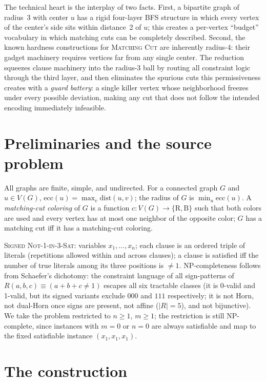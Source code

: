 \documentclass[11pt]{article}
\begin{document}
The technical heart is the interplay of two facts. First, a bipartite
graph of radius~3 with center $u$ has a rigid four-layer BFS structure
in which every vertex of the center's side sits within distance~2 of
$u$; this creates a per-vertex ``budget'' vocabulary in which matching
cuts can be completely described. Second, the known hardness
constructions for \textsc{Matching Cut} are inherently radius-4:
their gadget machinery requires vertices far from any single center.
The reduction squeezes clause machinery into the radius-3 ball by
routing all constraint logic through the third layer, and then
eliminates the spurious cuts this permissiveness creates with a
\emph{guard battery}: a single killer vertex whose neighborhood
freezes under every possible deviation, making any cut that does not
follow the intended encoding immediately infeasible.

\section{Preliminaries and the source problem}\label{sec:source}

All graphs are finite, simple, and undirected. For a connected graph
$G$ and $u \in V(G)$, $\mathrm{ecc}(u) = \max_v \mathrm{dist}(u,v)$;
the radius of $G$ is $\min_u \mathrm{ecc}(u)$. A \emph{matching-cut
coloring} of $G$ is a function $c : V(G) \to \{\mathrm{R},
\mathrm{B}\}$ such that both colors are used and every vertex has at
most one neighbor of the opposite color; $G$ has a matching cut iff
it has a matching-cut coloring.

\textsc{Signed Not-1-in-3-Sat}: variables $x_1,\dots,x_n$; each
clause is an ordered triple of literals (repetitions allowed within
and across clauses); a clause is satisfied iff the number of true
literals among its three positions is $\neq 1$. NP-completeness
follows from Schaefer's dichotomy: the constraint language of all
sign-patterns of $R(a,b,c) \equiv (a{+}b{+}c \neq 1)$ escapes all six
tractable classes (it is 0-valid and 1-valid, but its signed variants
exclude $000$ and $111$ respectively; it is not Horn, not dual-Horn
once signs are present, not affine ($|R|=5$), and not bijunctive).
We take the problem restricted to $n \ge 1$, $m \ge 1$; the
restriction is still NP-complete, since instances with $m=0$ or $n=0$
are always satisfiable and map to the fixed satisfiable instance
$(x_1, x_1, x_1)$.

\section{The construction}\label{sec:construction}
\end{document}
